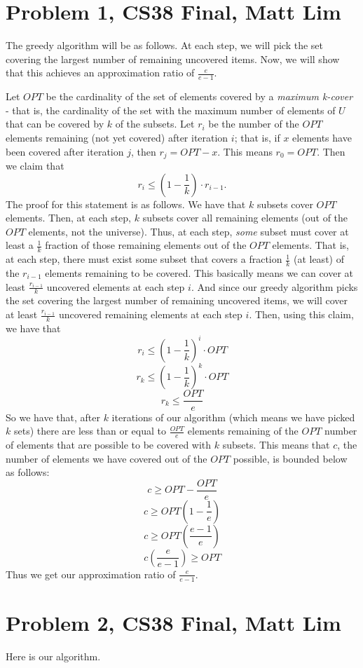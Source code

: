 \documentclass{article}
\begin{document}
\section*{Problem 1, CS38 Final, Matt Lim}
The greedy algorithm will be as follows. At each step, we will pick the set
covering the largest number of remaining uncovered items. Now, we will show that
this achieves an approximation ratio of $\frac{e}{e-1}$.

Let $OPT$ be the cardinality of the set of elements covered by a
\textit{maximum k-cover} - that is, the cardinality of the set
with the maximum number of elements of $U$ that can be covered by $k$ of the
subsets. Let $r_i$ be the number of the $OPT$ elements remaining (not yet
covered) after iteration $i$; that is, if $x$ elements have been covered after
iteration $j$, then $r_j = OPT - x$. This means $r_0 = OPT$. Then we claim that
\[ r_i \leq (1 - \frac{1}{k}) \cdot r_{i-1}. \]
The proof for this statement is as follows. We have
that $k$ subsets cover $OPT$ elements. Then, at each step, $k$ subsets cover
all remaining elements (out of the $OPT$ elements, not the universe).
Thus, at each step, \textit{some} subset must cover at least a $\frac{1}{k}$
fraction of those remaining elements out of the $OPT$ elements. That is, at
each step, there
must exist some subset that covers a fraction $\frac{1}{k}$ (at least) of the $r_{i-1}$
elements remaining to be covered. This basically means we can cover at least
$\frac{r_{i-1}}{k}$ uncovered elements at each step $i$. And since our
greedy algorithm picks the set covering the largest number of remaining
uncovered items, we will cover at least $\frac{r_{i-1}}{k}$ uncovered remaining
elements at each step $i$. Then, using this claim, we have that
\[ r_i \leq (1 - \frac{1}{k})^i \cdot OPT \]
\[ r_k \leq (1 - \frac{1}{k})^k \cdot OPT \]
\[ r_k \leq \frac{OPT}{e} \]
So we have that, after $k$ iterations of our algorithm (which means we have
picked $k$ sets) there are less than or equal to $\frac{OPT}{e}$ elements
remaining of the $OPT$ number of elements that are possible to be covered with
$k$ subsets. This means that $c$, the number of elements we have
covered out of the $OPT$ possible, is bounded below as follows:
\[ c \geq OPT - \frac{OPT}{e} \]
\[ c \geq OPT(1 - \frac{1}{e}) \]
\[ c \geq OPT(\frac{e-1}{e}) \]
\[ c(\frac{e}{e-1}) \geq OPT \]
Thus we get our approximation ratio of $\frac{e}{e-1}$.
\newpage

\section*{Problem 2, CS38 Final, Matt Lim}
Here is our algorithm.
\end{document}
